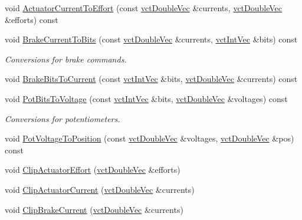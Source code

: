 \begin{DoxyCompactItemize}
\item 
void \hyperlink{classsaw_robot_i_o1394_1_1osa_robot1394_a414f641a56bffe2120265f739b14fb8e}{Actuator\+Current\+To\+Effort} (const \hyperlink{vct_dynamic_vector_types_8h_ade4b3068c86fb88f41af2e5187e491c2}{vct\+Double\+Vec} \&currents, \hyperlink{vct_dynamic_vector_types_8h_ade4b3068c86fb88f41af2e5187e491c2}{vct\+Double\+Vec} \&efforts) const 
\item 
void \hyperlink{classsaw_robot_i_o1394_1_1osa_robot1394_a7e92d8c12c7df3258b6cbf2ff4f3b34f}{Brake\+Current\+To\+Bits} (const \hyperlink{vct_dynamic_vector_types_8h_ade4b3068c86fb88f41af2e5187e491c2}{vct\+Double\+Vec} \&currents, \hyperlink{vct_dynamic_vector_types_8h_a47260df0b570a25352b3f318ed0b4c4e}{vct\+Int\+Vec} \&bits) const 
\begin{DoxyCompactList}\small\item\em Conversions for brake commands. \end{DoxyCompactList}\item 
void \hyperlink{classsaw_robot_i_o1394_1_1osa_robot1394_ad4d4e27d20db8e829190b67d12b3849f}{Brake\+Bits\+To\+Current} (const \hyperlink{vct_dynamic_vector_types_8h_a47260df0b570a25352b3f318ed0b4c4e}{vct\+Int\+Vec} \&bits, \hyperlink{vct_dynamic_vector_types_8h_ade4b3068c86fb88f41af2e5187e491c2}{vct\+Double\+Vec} \&currents) const 
\item 
void \hyperlink{classsaw_robot_i_o1394_1_1osa_robot1394_ab0b7370aab8c9ddd1baeecdf5db6686a}{Pot\+Bits\+To\+Voltage} (const \hyperlink{vct_dynamic_vector_types_8h_a47260df0b570a25352b3f318ed0b4c4e}{vct\+Int\+Vec} \&bits, \hyperlink{vct_dynamic_vector_types_8h_ade4b3068c86fb88f41af2e5187e491c2}{vct\+Double\+Vec} \&voltages) const 
\begin{DoxyCompactList}\small\item\em Conversions for potentiometers. \end{DoxyCompactList}\item 
void \hyperlink{classsaw_robot_i_o1394_1_1osa_robot1394_a2f9dee18922338235bafae71cdf9b455}{Pot\+Voltage\+To\+Position} (const \hyperlink{vct_dynamic_vector_types_8h_ade4b3068c86fb88f41af2e5187e491c2}{vct\+Double\+Vec} \&voltages, \hyperlink{vct_dynamic_vector_types_8h_ade4b3068c86fb88f41af2e5187e491c2}{vct\+Double\+Vec} \&pos) const 
\item 
void \hyperlink{classsaw_robot_i_o1394_1_1osa_robot1394_a4fca5b824e45e5ee67b0e4c85f5e578d}{Clip\+Actuator\+Effort} (\hyperlink{vct_dynamic_vector_types_8h_ade4b3068c86fb88f41af2e5187e491c2}{vct\+Double\+Vec} \&efforts)
\item 
void \hyperlink{classsaw_robot_i_o1394_1_1osa_robot1394_acf20ff44ca8642b3bde8666b5c44b96b}{Clip\+Actuator\+Current} (\hyperlink{vct_dynamic_vector_types_8h_ade4b3068c86fb88f41af2e5187e491c2}{vct\+Double\+Vec} \&currents)
\item 
void \hyperlink{classsaw_robot_i_o1394_1_1osa_robot1394_aa9f9b0e565e7b7546a83288b95c51fd1}{Clip\+Brake\+Current} (\hyperlink{vct_dynamic_vector_types_8h_ade4b3068c86fb88f41af2e5187e491c2}{vct\+Double\+Vec} \&currents)
\end{DoxyCompactItemize}


